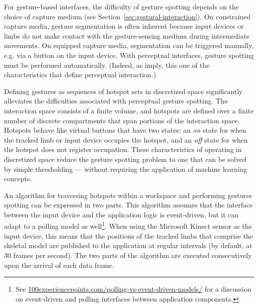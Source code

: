 For gesture-based interfaces, the difficulty of gesture spotting depends on the choice of capture medium (see Section~\ref{sec:gestural-interaction}). On constrained capture media, gesture segmentation is often inherent because input devices or limbs do not make contact with the gesture-sensing medium during intermediate movements. On equipped capture media, segmentation can be triggered manually, e.g. via a button on the input device. With perceptual interfaces, gesture spotting must be performed automatically. (Indeed, as \textcite{Turk:2000} imply, this one of the characteristics that define perceptual interaction.)

Defining gestures as sequences of hotspot sets in discretized space significantly alleviates the difficulties associated with perceptual gesture spotting. The interaction space consists of a finite volume, and hotspots are defined over a finite number of discrete compartments that span portions of the interaction space. Hotspots behave like virtual buttons that have two states: an \emph{on} state for when the tracked limb or input device occupies the hotspot, and an \emph{off} state for when the hotspot does not register occupation. These characteristics of operating in discretized space reduce the gesture spotting problem to one that can be solved by simple thresholding \parencite{Hoste:2013, Hartmann:2007} --- without requiring the application of machine learning concepts.

An algorithm for traversing hotspots within a workspace and performing gestures spotting can be expressed in two parts. This algorithm assumes that the interface between the input device and the application logic is event-driven, but it can adapt to a polling model as well\footnote{See  \href{http://100experiencepoints.com/polling-vs-event-driven-models/}{100experiencepoints.com/polling-vs-event-driven-models/} for a discussion on event-driven and polling interfaces between application components.}. When using the Microsoft Kinect sensor as the input device, this means that the positions of the tracked limbs that comprise the skeletal model are published to the application at regular intervals (by default, at 30 frames per second). The two parts of the algorithm are executed consecutively upon the arrival of each data frame.

